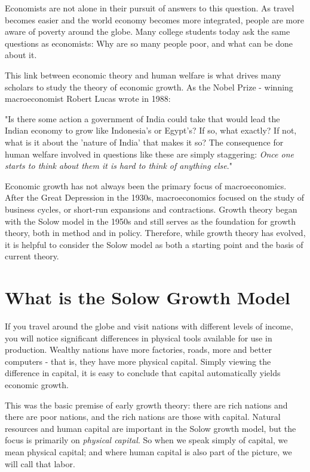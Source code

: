 \documentclass[11pt]{article} %
\begin{document}
Economists are not alone in their pursuit of answers to this question. As travel becomes easier and the world economy becomes more integrated, people are more aware of poverty around the globe. Many college students today ask the same questions as economists: Why are so many people poor, and what can be done about it.

This link between economic theory and human welfare is what drives many scholars to study the theory of economic growth. As the Nobel Prize - winning macroeconomist Robert Lucas wrote in 1988: \\
\begin{center}
"Is there some action a government of India could take that would lead the Indian economy to grow like Indonesia's or Egypt's? If so, what exactly? If not, what is it about the 'nature of India' that makes it so? The consequence for human welfare involved in questions like these are simply staggering: \textit{Once one starts to think about them it is hard to think of anything else}."
\end{center}
Economic growth has not always been the primary focus of macroeconomics. After the Great Depression in the 1930s, macroeconomics focused on the study of business cycles, or short-run expansions and contractions. Growth theory began with the Solow model in the 1950s and still serves as the foundation for growth theory, both in method and in policy. Therefore, while growth theory has evolved, it is helpful to consider the Solow model as both a starting point and the basis of current theory.
\section*{\textbf{What is the Solow Growth Model}}
If you travel around the globe and visit nations with different levels of income, you will notice significant differences in physical tools available for use in production. Wealthy nations have more factories, roads, more and better computers - that is, they have more physical capital. Simply viewing the difference in capital, it is easy to conclude that capital automatically yields economic growth.

This was the basic premise of early growth theory: there are rich nations and there are poor nations, and the rich nations are those with capital. Natural resources and human capital are important in the Solow growth model, but the focus is primarily on \textit{physical capital}. So when we speak simply of capital, we mean physical capital; and where human capital is also part of the picture, we will call that labor.
\end{document}
